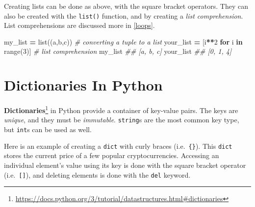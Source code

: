 \documentclass[
  12pt,
]{krantz}
\makeatletter
\newenvironment{Shaded}{\begin{snugshade}}{\end{snugshade}}
\newcommand{\BuiltInTok}[1]{#1}
\newcommand{\CommentTok}[1]{\textcolor[rgb]{0.37,0.37,0.37}{\textit{#1}}}
\newcommand{\ControlFlowTok}[1]{\textcolor[rgb]{0.27,0.27,0.27}{\textbf{#1}}}
\newcommand{\DecValTok}[1]{\textcolor[rgb]{0.06,0.06,0.06}{#1}}
\newcommand{\KeywordTok}[1]{\textcolor[rgb]{0.27,0.27,0.27}{\textbf{#1}}}
\newcommand{\NormalTok}[1]{#1}
\newcommand{\OperatorTok}[1]{\textcolor[rgb]{0.43,0.43,0.43}{\textbf{#1}}}
\newcommand{\StringTok}[1]{\textcolor[rgb]{0.5,0.5,0.5}{#1}}
\renewcommand{\href}[2]{#2\footnote{\url{#1}}}
\newenvironment{kframe}{%
\medskip{}
\setlength{\fboxsep}{.8em}
 \def\at@end@of@kframe{}%
 \ifinner\ifhmode%
  \def\at@end@of@kframe{\end{minipage}}%
  \begin{minipage}{\columnwidth}%
 \fi\fi%
 \def\FrameCommand##1{\hskip\@totalleftmargin \hskip-\fboxsep
 \colorbox{shadecolor}{##1}\hskip-\fboxsep
     \hskip-\linewidth \hskip-\@totalleftmargin \hskip\columnwidth}%
 \MakeFramed {\advance\hsize-\width
   \@totalleftmargin\z@ \linewidth\hsize
   \@setminipage}}%
 {\par\unskip\endMakeFramed%
 \at@end@of@kframe}
\renewenvironment{Shaded}{\begin{kframe}}{\end{kframe}}
\makeatother
\begin{document}
Creating lists can be done as above, with the square bracket operators. They can also be created with the \texttt{list()} function, and by creating a \emph{list comprehension}. List comprehensions are discussed more in \ref{loops}.

\begin{Shaded}
\begin{Highlighting}[]
\NormalTok{my\_list }\OperatorTok{=} \BuiltInTok{list}\NormalTok{((}\StringTok{\textquotesingle{}a\textquotesingle{}}\NormalTok{,}\StringTok{\textquotesingle{}b\textquotesingle{}}\NormalTok{,}\StringTok{\textquotesingle{}c\textquotesingle{}}\NormalTok{)) }\CommentTok{\# converting a tuple to a list}
\NormalTok{your\_list }\OperatorTok{=}\NormalTok{ [i}\OperatorTok{**}\DecValTok{2} \ControlFlowTok{for}\NormalTok{ i }\KeywordTok{in} \BuiltInTok{range}\NormalTok{(}\DecValTok{3}\NormalTok{)] }\CommentTok{\# list comprehension}
\NormalTok{my\_list}
\CommentTok{\#\# [\textquotesingle{}a\textquotesingle{}, \textquotesingle{}b\textquotesingle{}, \textquotesingle{}c\textquotesingle{}]}
\NormalTok{your\_list}
\CommentTok{\#\# [0, 1, 4]}
\end{Highlighting}
\end{Shaded}

\hypertarget{dictionaries-in-python}{%
\section{Dictionaries In Python}\label{dictionaries-in-python}}

\href{https://docs.python.org/3/tutorial/datastructures.html\#dictionaries}{\textbf{Dictionaries}} in Python provide a container of key-value pairs. The keys are \emph{unique}, and they must be \emph{immutable}. \texttt{string}s are the most common key type, but \texttt{int}s can be used as well.

Here is an example of creating a \texttt{dict} with curly braces (i.e.~\texttt{\{\}}). This \texttt{dict} stores the current price of a few popular cryptocurrencies. Accessing an individual element's value using its key is done with the square bracket operator (i.e.~\texttt{{[}{]}}), and deleting elements is done with the \texttt{del} keyword.
\end{document}
